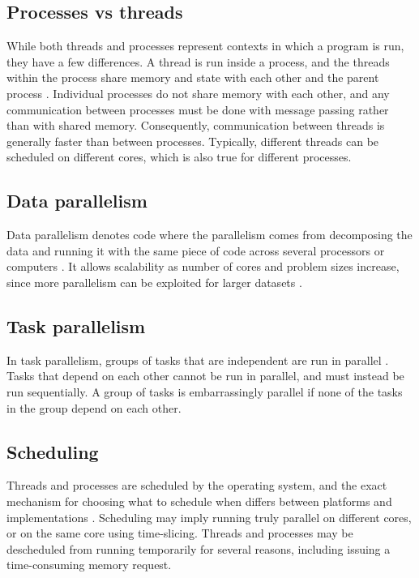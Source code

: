 \subsection{Processes vs threads}
While both threads and processes represent contexts in which a program is run, they have a few differences. A thread is run inside
a process, and the threads within the process share memory and state with each other and the parent
process \cite{singh_2013_parallel_padpwprfmm}. Individual processes do not share memory with each other, and any
communication between processes must be done with message passing rather than with shared memory. Consequently, communication
between threads is generally faster than between processes.
Typically, different threads can be scheduled on different cores, which is also true for different processes.

\subsection{Data parallelism}
Data parallelism denotes code where the parallelism comes from decomposing the data and running it with the same piece of code
across several processors or computers \cite{singh_2013_parallel_padpwprfmm}. It allows scalability as number of cores and problem
sizes increase, since more parallelism can be exploited for larger datasets \cite[p. 24]{mccool_2012_structured_spppfec}.

\subsection{Task parallelism}
In task parallelism, groups of tasks that are independent are run in parallel \cite{chow_2015_pipeline_ppiaote}.
Tasks that depend on each other cannot be run in parallel, and must instead be run sequentially.
A group of tasks is embarrassingly parallel if none of the tasks in the group depend on each other.

\subsection{Scheduling}
Threads and processes are scheduled by the operating system, and the exact mechanism for choosing what to schedule when differs
between platforms and implementations \cite[p. 472]{herlihy_2012_art_taomprr}. Scheduling may imply running truly parallel
on different cores, or on the same core using time-slicing. Threads and processes may be descheduled from running temporarily for several
reasons, including issuing a time-consuming memory request.

